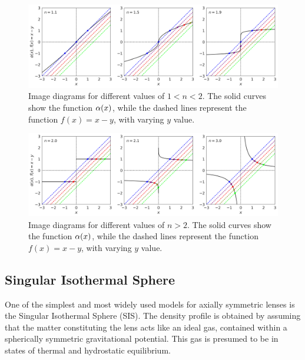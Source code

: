\begin{figure}[h!]
    \centering
    \includegraphics[width=\linewidth, keepaspectratio]{img//chapter3/image_diagrams_1_2.png}
    \caption[Image diagrams for power-law lenses with $1<n<2$]{Image diagrams for different values of $1<n<2$. The solid curves show the function $\alpha (x)$, while the dashed lines represent the function $f (x) = x - y$, with varying $y$ value.}
    \label{fig:image_diagrams_1_2}
\end{figure}

\begin{figure}[h!]
    \centering
    \includegraphics[width=\linewidth, keepaspectratio]{img//chapter3/image_diagrams_2.png}
    \caption[Image diagrams for power-law lenses with $n>2$]{Image diagrams for different values of $n>2$. The solid curves show the function $\alpha (x)$, while the dashed lines represent the function $f (x) = x - y$, with varying $y$ value.}
    \label{fig:image_diagrams_2}
\end{figure}


\subsection{Singular Isothermal Sphere}
\label{subsec:sis}
One of the simplest and most widely used models for axially symmetric lenses is the Singular Isothermal Sphere (SIS). The density profile is obtained by assuming that the matter constituting the lens acts like an ideal gas, contained within a spherically symmetric gravitational potential. This gas is presumed to be in states of thermal and hydrostatic equilibrium.

